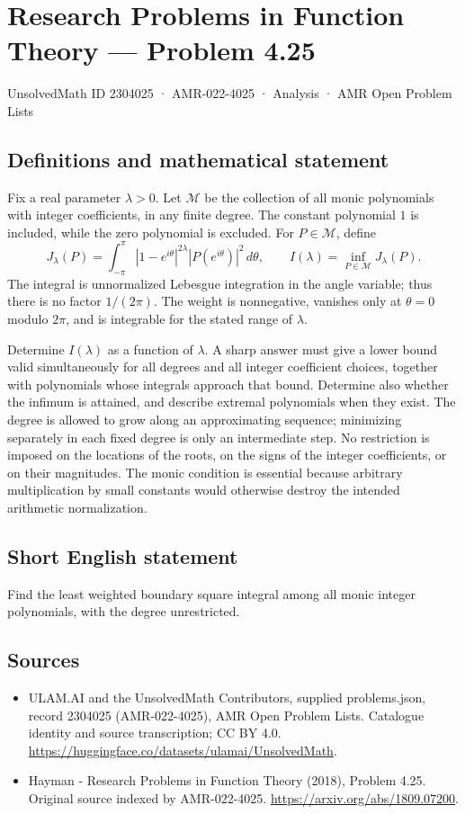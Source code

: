 \documentclass[11pt,a4paper]{article}
\begin{document}
\section*{Research Problems in Function Theory — Problem 4.25}\label{2304025}
{\small UnsolvedMath ID 2304025 · AMR-022-4025 · Analysis · AMR Open Problem Lists}
\subsection{Definitions and mathematical statement}
Fix a real parameter $\lambda>0$. Let $\mathcal M$ be the collection
of all monic polynomials with integer coefficients, in any finite
degree. The constant polynomial $1$ is included, while the zero
polynomial is excluded. For $P\in\mathcal M$, define
\[
 J_\lambda(P)=\int_{-\pi}^{\pi}
       |1-e^{i\theta}|^{2\lambda}|P(e^{i\theta})|^2\,d\theta,
 \qquad I(\lambda)=\inf_{P\in\mathcal M}J_\lambda(P).
\]
The integral is unnormalized Lebesgue integration in the angle
variable; thus there is no factor $1/(2\pi)$. The weight is
nonnegative, vanishes only at $\theta=0$ modulo $2\pi$, and is
integrable for the stated range of $\lambda$.

Determine $I(\lambda)$ as a function of $\lambda$. A sharp answer
must give a lower bound valid simultaneously for all degrees and
all integer coefficient choices, together with polynomials whose
integrals approach that bound. Determine also whether the infimum
is attained, and describe extremal polynomials when they exist.
The degree is allowed to grow along an approximating sequence;
minimizing separately in each fixed degree is only an intermediate
step. No restriction is imposed on the locations of the roots,
on the signs of the integer coefficients, or on their magnitudes.
The monic condition is essential because arbitrary multiplication
by small constants would otherwise destroy the intended arithmetic
normalization.
\subsection{Short English statement}
Find the least weighted boundary square integral among all monic integer polynomials, with the degree unrestricted.
\subsection{Sources}
\begin{itemize}
\item[S1] ULAM.AI and the UnsolvedMath Contributors, supplied problems.json, record 2304025 (AMR-022-4025), AMR Open Problem Lists. Catalogue identity and source transcription; CC BY 4.0.
\url{https://huggingface.co/datasets/ulamai/UnsolvedMath}.
\item[S2] Hayman - Research Problems in Function Theory (2018), Problem 4.25. Original source indexed by AMR-022-4025.
\url{https://arxiv.org/abs/1809.07200}.
\end{itemize}
\end{document}

